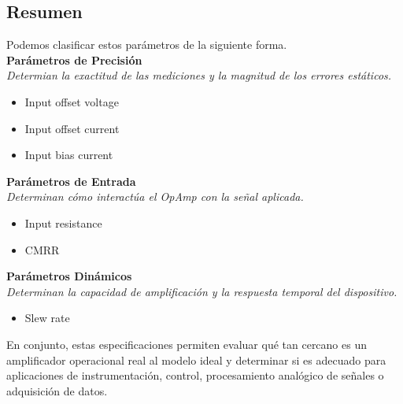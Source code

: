 \documentclass{article}
\begin{document}
\subsection{Resumen}
Podemos clasificar estos parámetros de la siguiente forma.\\
\vspace{0.3cm}
\textbf{Parámetros de Precisión}\\
\textit{Determian la exactitud de las mediciones y la magnitud de los errores estáticos.}
\begin{itemize}
  \item Input offset voltage
  \item Input offset current
  \item Input bias current
\end{itemize}
\textbf{Parámetros de Entrada}\\
\textit{Determinan cómo interactúa el OpAmp con la señal aplicada.}
\begin{itemize}
  \item Input resistance
  \item CMRR
\end{itemize}
\textbf{Parámetros Dinámicos}\\
\textit{Determinan la capacidad de amplificación y la respuesta temporal del dispositivo.}
\begin{itemize}
  \item Slew rate
\end{itemize}

En conjunto, estas especificaciones permiten evaluar qué tan cercano es un amplificador operacional real al modelo ideal y determinar si es adecuado para aplicaciones de instrumentación, control, procesamiento analógico de señales o adquisición de datos.
\end{document}
